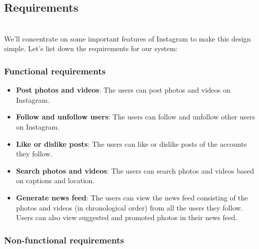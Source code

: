 

\subsection{Requirements}\label{t6ttYaWK0eildvuzzau6X}
\\
We'll concentrate on some important features of Instagram to make this design simple. Let's list down the requirements for our system:

\subsubsection{Functional requirements}\label{ktcsQZMkapzAvcaNI_uW1}

\begin{itemize}
\item
\protect{}\label{7SVt0P7Eg2arq-ZazJWwd}
\textbf{Post photos and videos}: The users can post photos and videos on Instagram.
\item
\protect{}\label{sGJpnP0PtNWWyP85atM2R}
\textbf{Follow and unfollow users}: The users can follow and unfollow other users on Instagram.
\item
\protect{}\label{Z7fxS6ORBH9z52zcFekbm}
\textbf{Like or dislike posts}: The users can like or dislike posts of the accounts they follow.
\item
\protect{}\label{jE_BTNkZ6-Xd1-mh7fvZd}
\textbf{Search photos and videos}: The users can search photos and videos based on captions and location.
\item
\protect{}\label{Vg976NItb5UCx-eDgpHG-}
\textbf{Generate news feed}: The users can view the news feed consisting of the photos and videos (in chronological order) from all the users they follow. Users can also view suggested and promoted photos in their news feed.
\end{itemize}

\subsubsection{Non-functional requirements}\label{Mc2ieJ14bBVmNDHxz5cB2}

